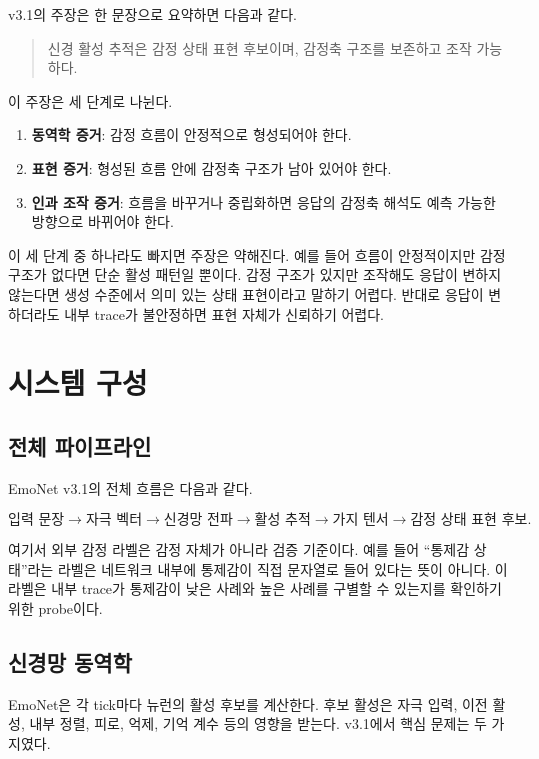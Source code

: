 \documentclass[11pt,a4paper]{article}
\begin{document}
v3.1의 주장은 한 문장으로 요약하면 다음과 같다.

\begin{quote}
신경 활성 추적은 감정 상태 표현 후보이며, 감정축 구조를 보존하고 조작 가능하다.
\end{quote}

이 주장은 세 단계로 나뉜다.

\begin{enumerate}
  \item \textbf{동역학 증거}: 감정 흐름이 안정적으로 형성되어야 한다.
  \item \textbf{표현 증거}: 형성된 흐름 안에 감정축 구조가 남아 있어야 한다.
  \item \textbf{인과 조작 증거}: 흐름을 바꾸거나 중립화하면 응답의 감정축 해석도 예측 가능한 방향으로 바뀌어야 한다.
\end{enumerate}

이 세 단계 중 하나라도 빠지면 주장은 약해진다. 예를 들어 흐름이 안정적이지만 감정 구조가 없다면 단순 활성 패턴일 뿐이다. 감정 구조가 있지만 조작해도 응답이 변하지 않는다면 생성 수준에서 의미 있는 상태 표현이라고 말하기 어렵다. 반대로 응답이 변하더라도 내부 trace가 불안정하면 표현 자체가 신뢰하기 어렵다.

\section{시스템 구성}

\subsection{전체 파이프라인}

EmoNet v3.1의 전체 흐름은 다음과 같다.

\[
\text{입력 문장}
\rightarrow
\text{자극 벡터}
\rightarrow
\text{신경망 전파}
\rightarrow
\text{활성 추적}
\rightarrow
\text{가지 텐서}
\rightarrow
\text{감정 상태 표현 후보}.
\]

여기서 외부 감정 라벨은 감정 자체가 아니라 검증 기준이다. 예를 들어 ``통제감 상태''라는 라벨은 네트워크 내부에 통제감이 직접 문자열로 들어 있다는 뜻이 아니다. 이 라벨은 내부 trace가 통제감이 낮은 사례와 높은 사례를 구별할 수 있는지를 확인하기 위한 probe이다.

\subsection{신경망 동역학}

EmoNet은 각 tick마다 뉴런의 활성 후보를 계산한다. 후보 활성은 자극 입력, 이전 활성, 내부 정렬, 피로, 억제, 기억 계수 등의 영향을 받는다. v3.1에서 핵심 문제는 두 가지였다.
\end{document}
